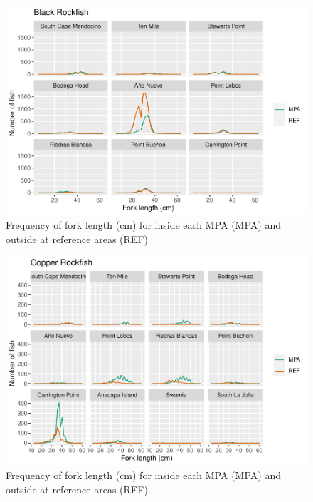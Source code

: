 \documentclass[
]{article}
\begin{document}
\begin{figure}
\centering
\includegraphics{CCRFP_available_data_for_assessments_files/figure-latex/unnamed-chunk-4-1.pdf}
\caption{\label{fig:unnamed-chunk-4-1}Frequency of fork length (cm) for inside each MPA (MPA) and outside at reference areas (REF)}
\end{figure}

\begin{figure}
\centering
\includegraphics{CCRFP_available_data_for_assessments_files/figure-latex/unnamed-chunk-4-2.pdf}
\caption{\label{fig:unnamed-chunk-4-2}Frequency of fork length (cm) for inside each MPA (MPA) and outside at reference areas (REF)}
\end{figure}
\end{document}
